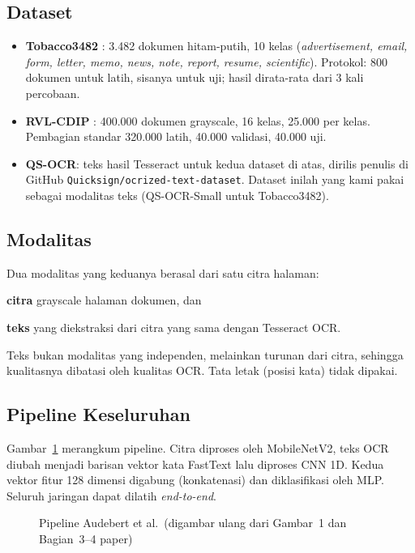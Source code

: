 \subsection{Dataset}
\begin{itemize}
  \item \textbf{Tobacco3482} \parencite{kumar2014}: 3.482 dokumen hitam-putih, 10 kelas
        (\emph{advertisement, email, form, letter, memo, news, note, report, resume,
        scientific}). Protokol: 800 dokumen untuk latih, sisanya untuk uji; hasil dirata-rata
        dari 3 kali percobaan.
  \item \textbf{RVL-CDIP} \parencite{harley2015}: 400.000 dokumen grayscale, 16 kelas,
        25.000 per kelas. Pembagian standar 320.000 latih, 40.000 validasi, 40.000 uji.
  \item \textbf{QS-OCR}: teks hasil Tesseract untuk kedua dataset di atas, dirilis penulis
        di GitHub \texttt{Quicksign/ocrized-text-dataset}. Dataset inilah yang kami pakai
        sebagai modalitas teks (QS-OCR-Small untuk Tobacco3482).
\end{itemize}

\subsection{Modalitas}
Dua modalitas yang keduanya berasal dari satu citra halaman:
\begin{enumerate*}[label=(\alph*)]
  \item \textbf{citra} grayscale halaman dokumen, dan
  \item \textbf{teks} yang diekstraksi dari citra yang sama dengan Tesseract OCR.
\end{enumerate*}
Teks bukan modalitas yang independen, melainkan turunan dari citra, sehingga kualitasnya
dibatasi oleh kualitas OCR. Tata letak (posisi kata) tidak dipakai.

\subsection{Pipeline Keseluruhan}
Gambar~\ref{fig:pipeline-audebert} merangkum pipeline. Citra diproses oleh MobileNetV2,
teks OCR diubah menjadi barisan vektor kata FastText lalu diproses CNN 1D. Kedua vektor
fitur 128 dimensi digabung (konkatenasi) dan diklasifikasi oleh MLP. Seluruh jaringan
dapat dilatih \emph{end-to-end}.

\begin{figure}[H]
  \centering
  
  \caption{Pipeline Audebert et al.\ (digambar ulang dari Gambar~1 dan Bagian~3--4 paper)}
  \label{fig:pipeline-audebert}
\end{figure}

